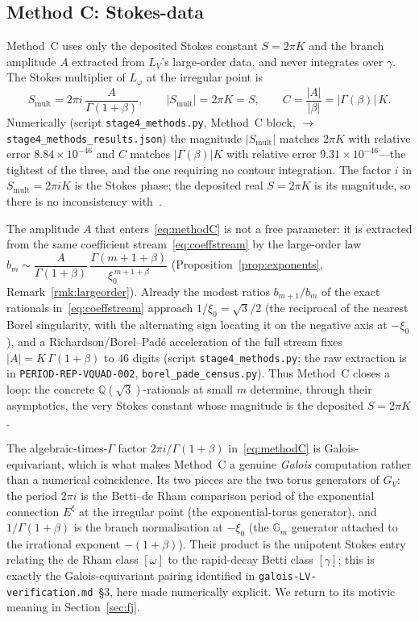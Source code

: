 \documentclass[11pt,reqno]{amsart}
\theoremstyle{plain}
\theoremstyle{definition}
\newcommand{\Lphi}{L_{\varphi}}
\newcommand{\LV}{L_{V}}
\newcommand{\Qsqrt}{\mathbb{Q}(\sqrt3)}
\newcommand{\xizero}{\xi_0}
\newcommand{\Gm}{\mathbb{G}_m}
\providecommand{\C}{}\renewcommand{\C}{C}
\begin{document}
\subsection{Method C: Stokes-data}\label{sub:methodC}
Method~C uses only the deposited Stokes constant $S=2\pi K$ and the branch amplitude $A$ extracted
from $\LV$'s large-order data, and never integrates over $\gamma$. The Stokes multiplier of
$\Lphi$ at the irregular point is
\begin{equation}\label{eq:methodC}
  S_{\mathrm{mult}}=2\pi i\,\frac{A}{\Gamma(1+\beta)},\qquad
  \lvert S_{\mathrm{mult}}\rvert=2\pi K=S,\qquad
  \C=\frac{\lvert A\rvert}{\lvert\beta\rvert}=\lvert\Gamma(\beta)\rvert\,K .
\end{equation}
Numerically (script \texttt{stage4\_methods.py}, Method~C block, $\to$ \texttt{stage4\_methods\_results.json})
the magnitude $\lvert S_{\mathrm{mult}}\rvert$ matches $2\pi K$ with relative error
$8.84\times10^{-46}$ and $\C$ matches $\lvert\Gamma(\beta)\rvert K$ with relative error
$9.31\times10^{-46}$---the tightest of the three, and the one requiring no contour integration.
The factor $i$ in $S_{\mathrm{mult}}=2\pi iK$ is the Stokes phase; the deposited real
$S=2\pi K$ is its magnitude, so there is no inconsistency with~\cite{Vquad,StokesNote}.

The amplitude $A$ that enters~\eqref{eq:methodC} is not a free parameter: it is extracted from the
same coefficient stream~\eqref{eq:coeffstream} by the large-order law
$b_m\sim \dfrac{A}{\Gamma(1+\beta)}\,\dfrac{\Gamma(m+1+\beta)}{\xizero^{\,m+1+\beta}}$
(Proposition~\ref{prop:exponents}, Remark~\ref{rmk:largeorder}). Already the modest ratios
$b_{m+1}/b_m$ of the exact rationals in~\eqref{eq:coeffstream} approach $1/\xizero=\sqrt3/2$ (the
reciprocal of the nearest Borel singularity, with the alternating sign locating it on the negative
axis at $-\xizero$), and a Richardson/Borel--Pad\'e acceleration of the full stream fixes
$\lvert A\rvert=K\,\Gamma(1+\beta)$ to $46$ digits (script \texttt{stage4\_methods.py}; the raw
extraction is in \texttt{PERIOD-REP-VQUAD-002}, \texttt{borel\_pade\_census.py}). Thus Method~C
closes a loop: the concrete $\Qsqrt$-rationals at small $m$ determine, through their asymptotics,
the very Stokes constant whose magnitude is the deposited $S=2\pi K$.

The algebraic-times-$\Gamma$ factor $2\pi i/\Gamma(1+\beta)$ in~\eqref{eq:methodC} is
Galois-equivariant, which is what makes Method~C a genuine \emph{Galois} computation rather than a
numerical coincidence. Its two pieces are the two torus generators of $G_V$: the period $2\pi i$ is
the Betti--de Rham comparison period of the exponential connection $E^{\xi}$ at the irregular point
(the exponential-torus generator), and $1/\Gamma(1+\beta)$ is the branch normalisation at
$-\xizero$ (the $\Gm$ generator attached to the irrational exponent $-(1+\beta)$). Their product is
the unipotent Stokes entry relating the de Rham class $[\omega]$ to the rapid-decay Betti class
$[\gamma]$; this is exactly the Galois-equivariant pairing identified in
\texttt{galois-LV-verification.md}~\S3, here made numerically explicit. We return to its motivic
meaning in Section~\ref{sec:fj}.
\end{document}

